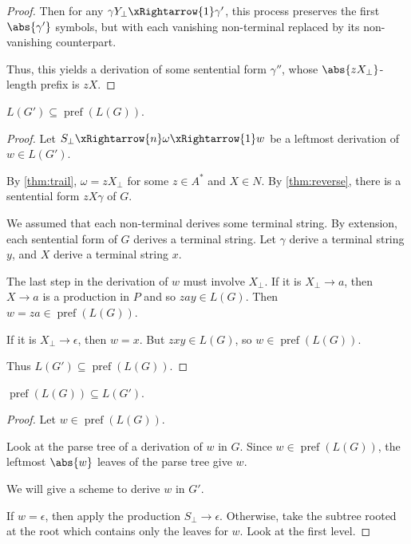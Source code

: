 \documentclass[12pt]{article}
\DeclareMathOperator{\pref}{pref}
\begin{document}
\begin{solution}
\begin{proof}
        Then for any $\gamma Y_\bot \xRightarrow{1} \gamma'$, this process
        preserves the first $\abs{\gamma'}$ symbols, but with each vanishing
        non-terminal replaced by its non-vanishing counterpart.

        Thus, this yields a derivation of some sentential form $\gamma''$,
        whose $\abs{zX_\bot}$-length prefix is $zX$.
    \end{proof}

    \begin{proposition}
        $L(G') \subseteq \pref(L(G))$.
    \end{proposition}
    \begin{proof}
        Let $S_\bot \xRightarrow{n} \omega \xRightarrow{1} w$ be a leftmost
        derivation of $w \in L(G')$.

        By \cref{thm:trail}, $\omega = z X_\bot$ for some $z \in A^*$ and
        $X \in N$.
        By \cref{thm:reverse}, there is a sentential form
        $z X \gamma$ of $G$.

        We assumed that each non-terminal derives some terminal string.
        By extension, each sentential form of $G$ derives a terminal string.
        Let $\gamma$ derive a terminal string $y$,
        and $X$ derive a terminal string $x$.

        The last step in the derivation of $w$ must involve $X_\bot$.
        If it is $X_\bot \to a$, then $X \to a$ is a production in $P$
        and so $zay \in L(G)$.
        Then $w = za \in \pref(L(G))$.

        If it is $X_\bot \to \epsilon$, then $w = x$.
        But $z x y \in L(G)$, so $w \in \pref(L(G))$.

        Thus $L(G') \subseteq \pref(L(G))$.
    \end{proof}

    \begin{proposition}
        $\pref(L(G)) \subseteq L(G')$.
    \end{proposition}
    \begin{proof}
        Let $w \in \pref(L(G))$.

        Look at the parse tree of a derivation of $w$ in $G$.
        Since $w \in \pref(L(G))$, the leftmost $\abs{w}$ leaves of
        the parse tree give $w$.

        We will give a scheme to derive $w$ in $G'$.

        If $w = \epsilon$, then apply the production $S_\bot \to \epsilon$.
        Otherwise, take the subtree rooted at the root which contains
        only the leaves for $w$.
        Look at the first level.


\end{proof}
\end{solution}
\end{document}

